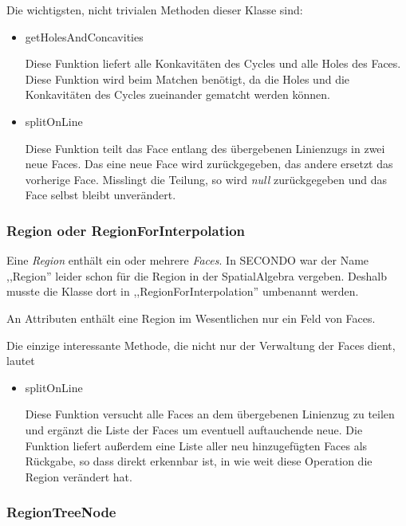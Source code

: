 Die wichtigsten, nicht trivialen Methoden dieser Klasse sind:

\begin{itemize}

\item getHolesAndConcavities

Diese Funktion liefert alle Konkavitäten des Cycles und alle Holes des Faces. Diese Funktion wird beim Matchen benötigt, da die Holes und die Konkavitäten des Cycles zueinander gematcht werden können.

\item splitOnLine

Diese Funktion teilt das Face entlang des übergebenen Linienzugs in zwei neue Faces. Das eine neue Face wird zurückgegeben, das andere ersetzt das vorherige Face. Misslingt die Teilung, so wird \textit{null} zurückgegeben und das Face selbst bleibt unverändert.

\end{itemize}

\subsubsection{Region oder RegionForInterpolation}

Eine \textit{Region} enthält ein oder mehrere \textit{Faces}. In SECONDO war der Name ,,Region'' leider schon für die Region in der SpatialAlgebra vergeben. Deshalb musste die Klasse dort in ,,RegionForInterpolation'' umbenannt werden.

An Attributen enthält eine Region im Wesentlichen nur ein Feld von Faces.

Die einzige interessante Methode, die nicht nur der Verwaltung der Faces dient, lautet 
\begin{itemize}
\item splitOnLine

Diese Funktion versucht alle Faces an dem übergebenen Linienzug zu teilen und ergänzt die Liste der Faces um eventuell auftauchende neue. Die Funktion liefert außerdem eine Liste aller neu hinzugefügten Faces als Rückgabe, so dass direkt erkennbar ist, in wie weit diese Operation die Region verändert hat.

\end{itemize}

\subsubsection{RegionTreeNode}

